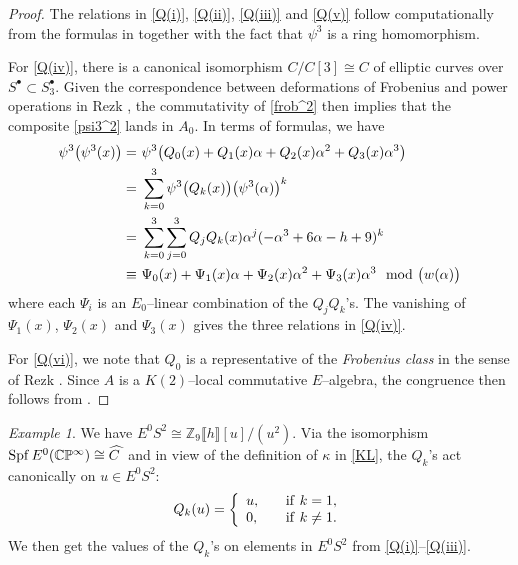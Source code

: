 \documentclass[microtype]{gtpart}     %
\theoremstyle{remark}
\newtheorem{ex}{Example}[section]
\theoremstyle{definition}
\newcommand{\mb}[1]{\mathbb{#1}}
\newcommand{\Spf}{{\rm Spf\thinspace}}
\newcommand{\BC}{{\mb C}}
\newcommand{\BP}{{\mb P}}
\newcommand{\BZ}{{\mb Z}}
\newcommand{\HC}{\widehat{C~}\!}
\newcommand{\md}{~~{\rm mod}~}
\newcommand{\A}{\alpha}
\newcommand{\K}{\kappa}
\newcommand{\p}{\psi^3}
\newcommand{\s}{S^\bullet}
\newcommand{\q}[1]{\fullref{prop:Q}\thinspace \eqref{Q(#1)}}
\begin{document}
\begin{proof}
 The relations in \eqref{Q(i)}, \eqref{Q(ii)}, \eqref{Q(iii)} and 
 \eqref{Q(v)} follow computationally from the formulas in  
 together with the fact that $\p$ is a ring homomorphism.  

 For \eqref{Q(iv)}, there is a canonical isomorphism $C/C[3] \cong C$ of 
 elliptic curves over $\s \subset \s_3$.  Given the correspondence between 
 deformations of Frobenius and power operations in Rezk 
 \cite[Theorem B]{cong}, the commutativity of \eqref{frob^2} then implies 
 that the composite \eqref{psi3^2} lands in $A_0$.  In terms of formulas, we 
 have 
 \begin{equation*}
 \begin{split}
  \p \big( \p(x) \big) = & ~ \p \big( Q_0(x) + Q_1(x) \A + Q_2(x) \A^2 + Q_3(x) \A^3 \big) \\
                       = & ~ \sum_{k = 0}^3 \p \big( Q_k(x) \big) \big( \p(\A) \big)^k \\
                       = & ~ \sum_{k = 0}^3 \sum_{j = 0}^3 Q_jQ_k(x) \A^j (-\A^3 + 6 \A - h + 9)^k \\
                  \equiv & ~ \Psi_0(x) + \Psi_1(x) \A + \Psi_2(x) \A^2 + \Psi_3(x) \A^3 \md \big( w(\A) \big) 
 \end{split}
 \end{equation*}
 where each $\Psi_i$ is an $E_0$--linear combination of the $Q_jQ_k$'s.  The 
 vanishing of $\Psi_1(x)$, $\Psi_2(x)$ and $\Psi_3(x)$ gives the three 
 relations in \eqref{Q(iv)}.  

 For \eqref{Q(vi)}, we note that $Q_0$ is a representative of the 
 {\em Frobenius class} in the sense of Rezk \cite[10.3]{cong}.  Since $A$ is 
 a $K(2)$--local commutative $E$--algebra, the congruence then follows from 
 \cite[Theorem A]{cong}.  
\end{proof}

\begin{ex}
\label{ex}
 We have $E^0 S^2 \cong \BZ_9 \llbracket h \rrbracket [u] / (u^2)$.  Via the 
 isomorphism $\Spf E^0(\BC\BP^\infty) \cong \HC$ and in view of the 
 definition of $\K$ in \eqref{KL}, the $Q_k$'s act canonically on 
 $u \in E^0 S^2$: 
 \[
  Q_k(u) = \left\{
  \begin{array}{ll}
    u,  & \quad {\rm if}~k = 1, \\
    0,  & \quad {\rm if}~k \neq 1.  \\
  \end{array}
  \right.
 \]
 We then get the values of the $Q_k$'s on elements in $E^0 S^2$ from 
 \q{i}--\eqref{Q(iii)}.  
\end{ex}
\end{document}
